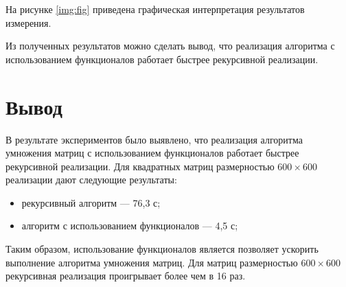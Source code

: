 \clearpage

На рисунке \ref{img:fig} приведена графическая интерпретация результатов измерения.



Из полученных результатов можно сделать вывод, что реализация алгоритма с использованием функционалов работает быстрее рекурсивной реализации.

\section*{Вывод}

В результате экспериментов было выявлено, что реализация алгоритма умножения матриц с использованием функционалов работает быстрее рекурсивной реализации. Для квадратных матриц размерностью $600\times600$ реализации дают следующие результаты:
\begin{itemize}
	\item рекурсивный алгоритм --- 76,3 с;
	\item алгоритм с использованием функционалов --- 4,5 с;
\end{itemize}

Таким образом, использование функционалов является позволяет ускорить выполнение алгоритма умножения матриц. Для матриц размерностью $600\times600$ рекурсивная реализация проигрывает более чем в 16 раз.

